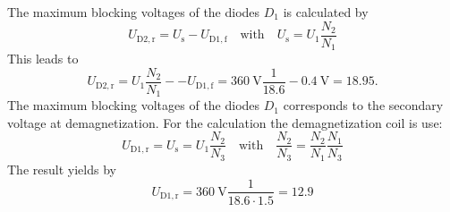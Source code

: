 \begin{solutionblock}
    The maximum blocking voltages of the diodes $D_\mathrm{1}$ is calculated by
    \begin{equation}
        U_\mathrm{D2,r}=U_\mathrm{s}-U_\mathrm{D1,f} \quad \text{with} \quad U_\mathrm{s}=U_\mathrm{1}\frac{N_\mathrm{2}}{N_\mathrm{1}}
    \end{equation}
    This leads to
    \begin{equation}
        U_\mathrm{D2,r}=U_\mathrm{1}\frac{N_\mathrm{2}}{N_\mathrm{1}}--U_\mathrm{D1,f}=
        \SI{360}{\volt}\frac{1}{18.6}-\SI{0.4}{\volt}=18.95.
    \end{equation}
    The maximum blocking voltages of the diodes $D_\mathrm{1}$ corresponds to the secondary voltage at demagnetization.
    For the calculation the demagnetization coil is use:
    \begin{equation}
        U_\mathrm{D1,r}=U_\mathrm{s}=U_\mathrm{1}\frac{N_\mathrm{2}}{N_\mathrm{3}} \quad \text{with} \quad
        \frac{N_\mathrm{2}}{N_\mathrm{3}}=\frac{N_\mathrm{2}}{N_\mathrm{1}}\frac{N_\mathrm{1}}{N_\mathrm{3}}
    \end{equation}
    The result yields by
    \begin{equation}
        U_\mathrm{D1,r}=\SI{360}{\volt}\frac{1}{18.6 \cdot 1.5}=12.9
    \end{equation}
\end{solutionblock}

